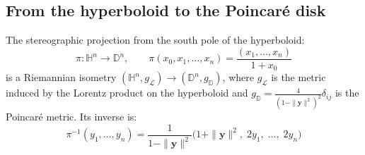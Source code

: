 \subsection{From the hyperboloid to the Poincaré disk}\label{subsec:isometria_hiperboloide_poincare}

\begin{theorem}\label{thm:isometria_hiperboloide_poincare}
The stereographic projection from the south pole of the hyperboloid:
\begin{equation}\label{eq:proyeccion_estereografica_hiperboloide}
\pi: \mathbb{H}^n \to \mathbb{D}^n, \qquad \pi(x_0, x_1, \ldots, x_n) = \frac{(x_1, \ldots, x_n)}{1 + x_0}
\end{equation}
is a Riemannian isometry $(\mathbb{H}^n, g_{\mathcal{L}}) \to (\mathbb{D}^n, g_{\mathbb{D}})$, where $g_{\mathcal{L}}$ is the metric induced by the Lorentz product on the hyperboloid and $g_{\mathbb{D}} = \frac{4}{(1-\|\mathbf{y}\|^2)^2}\delta_{ij}$ is the Poincaré metric. Its inverse is:
\begin{equation}\label{eq:inversa_proyeccion_estereografica}
\pi^{-1}(y_1, \ldots, y_n) = \frac{1}{1 - \|\mathbf{y}\|^2}\bigl(1 + \|\mathbf{y}\|^2,\; 2y_1,\; \ldots,\; 2y_n\bigr)
\end{equation}
\end{theorem}

